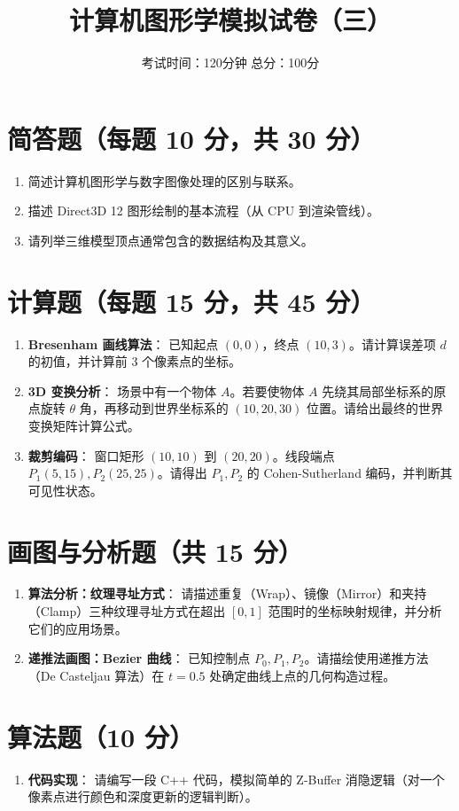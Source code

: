 \documentclass[UTF8]{ctexart}
\title{计算机图形学模拟试卷（三）}
\author{考试时间：120分钟 \quad 总分：100分}
\date{}
\begin{document}
\maketitle

\section{简答题（每题 10 分，共 30 分）}
\begin{enumerate}
    \item 简述计算机图形学与数字图像处理的区别与联系。
    \item 描述 Direct3D 12 图形绘制的基本流程（从 CPU 到渲染管线）。
    \item 请列举三维模型顶点通常包含的数据结构及其意义。
\end{enumerate}

\section{计算题（每题 15 分，共 45 分）}
\begin{enumerate}
    \item \textbf{Bresenham 画线算法}：
    已知起点 $(0, 0)$，终点 $(10, 3)$。请计算误差项 $d$ 的初值，并计算前 3 个像素点的坐标。
    
    \item \textbf{3D 变换分析}：
    场景中有一个物体 $A$。若要使物体 $A$ 先绕其局部坐标系的原点旋转 $\theta$ 角，再移动到世界坐标系的 $(10, 20, 30)$ 位置。请给出最终的世界变换矩阵计算公式。
    
    \item \textbf{裁剪编码}：
    窗口矩形 $(10, 10)$ 到 $(20, 20)$。线段端点 $P_1(5, 15), P_2(25, 25)$。请得出 $P_1, P_2$ 的 Cohen-Sutherland 编码，并判断其可见性状态。
\end{enumerate}

\section{画图与分析题（共 15 分）}
\begin{enumerate}
    \item \textbf{算法分析：纹理寻址方式}：
    请描述重复（Wrap）、镜像（Mirror）和夹持（Clamp）三种纹理寻址方式在超出 $[0, 1]$ 范围时的坐标映射规律，并分析它们的应用场景。
    \item \textbf{递推法画图：Bezier 曲线}：
    已知控制点 $P_0, P_1, P_2$。请描绘使用递推方法（De Casteljau 算法）在 $t=0.5$ 处确定曲线上点的几何构造过程。
\end{enumerate}

\section{算法题（10 分）}
\begin{enumerate}
    \item \textbf{代码实现}：
    请编写一段 C++ 代码，模拟简单的 Z-Buffer 消隐逻辑（对一个像素点进行颜色和深度更新的逻辑判断）。
\end{enumerate}
\end{document}
